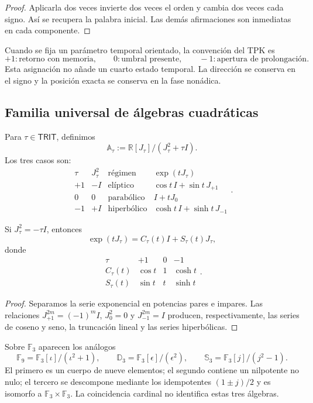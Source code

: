 \begin{proof}
Aplicarla dos veces invierte dos veces el orden y cambia dos veces cada
signo. Así se recupera la palabra inicial. Las demás afirmaciones son
inmediatas en cada componente.
\end{proof}

Cuando se fija un parámetro temporal orientado, la convención del TPK es
\[
 +1:\text{retorno con memoria},
 \qquad
 0:\text{umbral presente},
 \qquad
 -1:\text{apertura de prolongación}.
\]
Esta asignación no añade un cuarto estado temporal. La dirección se conserva
en el signo y la posición exacta se conserva en la fase nonádica.

\subsection{Familia universal de álgebras cuadráticas}

Para \(\tau\in\mathsf{TRIT}\), definimos
\[
 \mathbb A_\tau:=\mathbb R[J_\tau]/(J_\tau^2+\tau I).
\]
Los tres casos son:
\[
\begin{array}{c|c|c|c}
\tau&J_\tau^2&\text{régimen}&\exp(tJ_\tau)\\\hline
+1&-I&\text{elíptico}&\cos t\,I+\sin t\,J_{+1}\\
0&0&\text{parabólico}&I+tJ_0\\
-1&+I&\text{hiperbólico}&\cosh t\,I+\sinh t\,J_{-1}
\end{array}.
\]

\begin{theorem}
\label{p12-83-c1-s11:thm:trit-exponencial-uniforme}
Si \(J_\tau^2=-\tau I\), entonces
\[
 \exp(tJ_\tau)
 =C_\tau(t)I+S_\tau(t)J_\tau,
\]
donde
\[
\begin{array}{c|ccc}
\tau&+1&0&-1\\\hline
C_\tau(t)&\cos t&1&\cosh t\\
S_\tau(t)&\sin t&t&\sinh t
\end{array}.
\]
\end{theorem}

\begin{proof}
Separamos la serie exponencial en potencias pares e impares. Las relaciones
\(J_{+1}^{2m}=(-1)^mI\), \(J_0^2=0\) y
\(J_{-1}^{2m}=I\) producen, respectivamente, las series de coseno y seno,
la truncación lineal y las series hiperbólicas.
\end{proof}

Sobre \(\mathbb F_3\) aparecen los análogos
\[
 \mathbb F_9=\mathbb F_3[\iota]/(\iota^2+1),
 \qquad
 \mathbb D_3=\mathbb F_3[\epsilon]/(\epsilon^2),
 \qquad
 \mathbb S_3=\mathbb F_3[j]/(j^2-1).
\]
El primero es un cuerpo de nueve elementos; el segundo contiene un nilpotente
no nulo; el tercero se descompone mediante los idempotentes
\((1\pm j)/2\) y es isomorfo a \(\mathbb F_3\times\mathbb F_3\). La
coincidencia cardinal no identifica estas tres álgebras.

